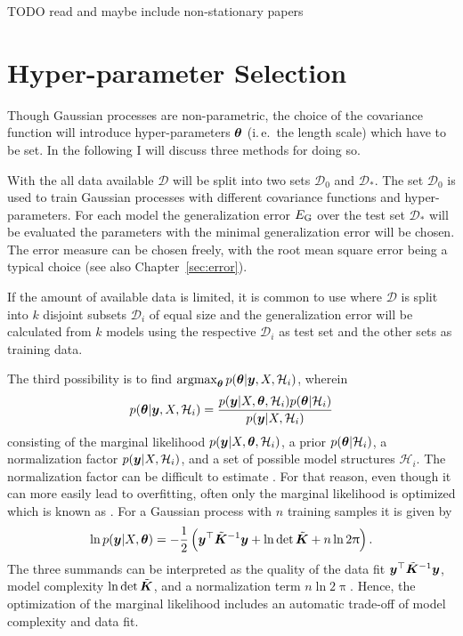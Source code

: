 TODO read and maybe include non-stationary papers

\section{Hyper-parameter Selection}
Though Gaussian processes are non-parametric, the choice of the covariance 
function will introduce hyper-parameters $\bm{\theta}$ (i.\,e.~the length scale) 
which have to be set.  In the following I will discuss three methods for doing 
so.

With the  all data available $\mathcal{D}$ will be 
split into two sets $\mathcal{D}_0$ and $\mathcal{D}_*$. The set $\mathcal{D}_0$ 
is used to train Gaussian processes with different covariance functions and 
hyper-parameters. For each model the generalization error $E_{\mathrm{G}}$ over the 
test set $\mathcal{D}_*$ will be evaluated the parameters with the minimal 
generalization error will be chosen. The error measure can be chosen freely, 
with the root mean square error being a typical choice (see also 
Chapter~\ref{sec:error}).

If the amount of available data is limited, it is common to use 
 where $\mathcal{D}$ is split into $k$ 
disjoint subsets $\mathcal{D}_i$ of equal size and the generalization error will 
be calculated from $k$ models using the respective $\mathcal{D}_i$ as test set 
and the other sets as training data.

The third possibility is to find $\operatorname*{argmax}_{\bm{\theta}} p(\bm{\theta} | \bm{y}, X, 
\mathcal{H}_i)$, wherein
\begin{equation}
    p(\bm{\theta} | \bm{y}, X, \mathcal{H}_i) = \frac{p(\bm{y} | X, \bm{\theta}, 
        \mathcal{H}_i) p(\bm{\theta} | \mathcal{H}_i)}{p(\bm{y} | X, 
        \mathcal{H}_i)}
\end{equation}
consisting of the marginal likelihood $p(\bm{y} | X, \bm{\theta}, \mathcal{H}_i)$, 
a prior $p(\bm{\theta} | \mathcal{H}_i)$, a normalization factor $p(\bm{y} | X, 
\mathcal{H}_i)$, and a set of possible model structures $\mathcal{H}_i$. The 
normalization factor can be difficult to estimate 
\parencite[109]{Rasmussen:2006vz}. For that reason, even though it can more 
easily lead to overfitting, often only the marginal likelihood is optimized 
which is known as . For a Gaussian 
process with $n$ training samples it is given by
\begin{equation}
    \ln p(\vc y | X, \vc\theta) = -\frac{1}{2}\del{\vc y\Tr \tilde{\mat{K}}^{-1} 
        \vc y + \ln \det \tilde{\mat K} + n \ln 2\uppi} \text{.}
\end{equation}
The three summands can be interpreted as the quality of the data fit $\bm{y}^{\top} 
\tilde{\bm{K}}^{-1} \bm{y}$, model complexity $\ln \det \tilde{\bm{K}}$, and 
a normalization term $n \ln 2\uppi$. Hence, the optimization of the marginal 
likelihood includes an automatic trade-off of model complexity and data fit.

